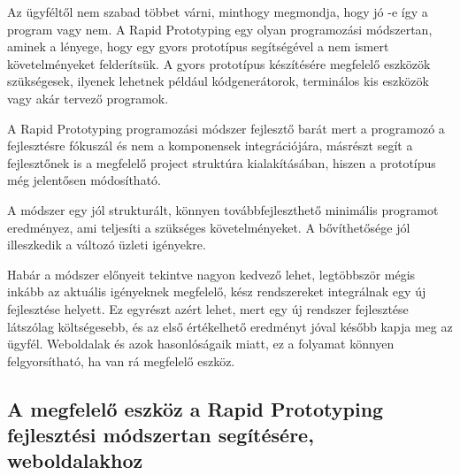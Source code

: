 \documentclass[a4paper,12pt,oneside]{report}
\begin{document}
\begin{justify}

	Az ügyféltől nem szabad többet várni, minthogy megmondja, hogy jó -e így a program vagy nem. A Rapid Prototyping egy olyan programozási módszertan, aminek a lényege, hogy egy gyors prototípus segítségével a nem ismert követelményeket felderítsük. A gyors prototípus készítésére megfelelő eszközök szükségesek, ilyenek lehetnek például kódgenerátorok, terminálos kis eszközök vagy akár tervező programok. \cite{website:rapid_prototype}

	A Rapid Prototyping programozási módszer fejlesztő barát mert a programozó a fejlesztésre fókuszál és nem a komponensek integrációjára, másrészt segít a fejlesztőnek is a megfelelő project struktúra kialakításában, hiszen a prototípus még jelentősen módosítható.

	A módszer egy jól strukturált, könnyen továbbfejleszthető minimális programot eredményez, ami teljesíti a szükséges követelményeket. A bővíthetősége jól illeszkedik a változó üzleti igényekre. 

	Habár a módszer előnyeit tekintve nagyon kedvező lehet, legtöbbször mégis inkább az aktuális igényeknek megfelelő, kész rendszereket integrálnak egy új fejlesztése helyett. Ez egyrészt azért lehet, mert egy új rendszer fejlesztése látszólag költségesebb, és az első értékelhető eredményt jóval később kapja meg az ügyfél. Weboldalak és azok hasonlóságaik miatt, ez a folyamat könnyen felgyorsítható, ha van rá megfelelő eszköz.

\end{justify}

\newpage
\subsection{A megfelelő eszköz a Rapid Prototyping fejlesztési módszertan segítésére, weboldalakhoz }
\end{document}
